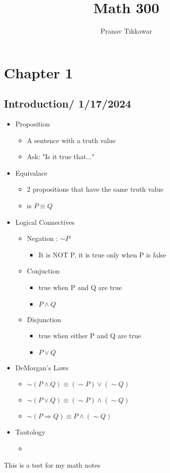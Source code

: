 \documentclass{article}
\author{Pranav Tikkawar}
\title{Math 300}
\begin{document}
\maketitle

\section{Chapter 1}
\subsection{Introduction/ 1/17/2024}

\begin{itemize}
    \item Proposition 
    \begin{itemize}
        \item A sentence with a truth value
        \item Ask: "Is it true that..."
    \end{itemize}
    \item Equivalace
    \begin{itemize}
        \item 2 propositions that have the same truth value
        \item is $P \equiv Q$
    \end{itemize}
    \item Logical Connectives
    \begin{itemize}
        \item Negation : $\sim P$ 
        \begin{itemize}
            \item It is NOT P, it is true only when P is false
        \end{itemize}
        \item Conjuction
        \begin{itemize}
            \item true when P and Q are true
            \item $P \wedge Q$
        \end{itemize}
        \item Disjunction
        \begin{itemize}
            \item true when either P and Q are true
            \item $P \vee Q$
        \end{itemize}
    \end{itemize}
    \item DeMorgan's Laws
    \begin{itemize}
        \item $\sim (P \land Q) \equiv (\sim P) \lor (\sim Q) $
        \item $\sim (P \lor Q) \equiv (\sim P) \land (\sim Q) $
        \item $\sim (P \Rightarrow Q) \equiv P \land (\sim Q)$
    \end{itemize}
    \item Tautology
    \begin{itemize}
        \item 
    \end{itemize}
\end{itemize}



This is a test for my math notes
\end{document}
